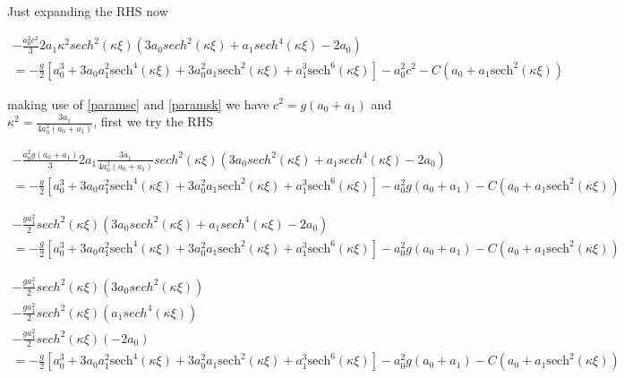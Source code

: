 \documentclass[subeqn]{article}
\begin{document}
 Just expanding the RHS now

\begin{multline*}
- \frac{a_0^2 c^2}{3}{2 a_1 \kappa^2 sech^2(\kappa \xi) \left(3a_0 sech^2(\kappa \xi) + a_1 sech^4(\kappa \xi)- 2a_0 \right)} \\
= {-\frac{g}{2} \left[a_0^3 + 3a_0a_1^2\text{sech}^4\left( \kappa \xi\right) + 3a_0^2a_1\text{sech}^2\left( \kappa \xi\right) + a_1^3\text{sech}^6\left( \kappa \xi\right)   \right] - a_0^2 c^2 - C \left(a_0 + a_1\text{sech}^2\left( \kappa \xi\right) \right)}
\end{multline*}

making use of \eqref{paramsc} and \eqref{paramsk} we have $c^2 = g(a_0 + a_1)$ and $\kappa^2  = \frac{3a_1}{4 a_0^2(a_0 + a_1)}$, first we try the RHS

\begin{multline*}
- \frac{a_0^2 g \left(a_0 + a_1\right)}{3}{2 a_1 \frac{3a_1}{4 a_0^2(a_0 + a_1)} sech^2(\kappa \xi) \left(3a_0 sech^2(\kappa \xi) + a_1 sech^4(\kappa \xi)- 2a_0 \right)} \\
= {-\frac{g}{2} \left[a_0^3 + 3a_0a_1^2\text{sech}^4\left( \kappa \xi\right) + 3a_0^2a_1\text{sech}^2\left( \kappa \xi\right) + a_1^3\text{sech}^6\left( \kappa \xi\right)   \right] - a_0^2 g \left(a_0 + a_1\right) - C \left(a_0 + a_1\text{sech}^2\left( \kappa \xi\right) \right)}
\end{multline*}

\begin{multline*}
- {\frac{ga_1^2 }{2} sech^2(\kappa \xi) \left(3a_0 sech^2(\kappa \xi) + a_1 sech^4(\kappa \xi)- 2a_0 \right)} \\
= {-\frac{g}{2} \left[a_0^3 + 3a_0a_1^2\text{sech}^4\left( \kappa \xi\right) + 3a_0^2a_1\text{sech}^2\left( \kappa \xi\right) + a_1^3\text{sech}^6\left( \kappa \xi\right)   \right] - a_0^2 g \left(a_0 + a_1\right) - C \left(a_0 + a_1\text{sech}^2\left( \kappa \xi\right) \right)}
\end{multline*}

\begin{multline*}
- {\frac{ga_1^2 }{2} sech^2(\kappa \xi) \left(3a_0 sech^2(\kappa \xi)\right)} \\
- {\frac{ga_1^2 }{2} sech^2(\kappa \xi) \left( a_1 sech^4(\kappa \xi) \right)}\\
- {\frac{ga_1^2 }{2} sech^2(\kappa \xi) \left(- 2a_0 \right)}\\
= {-\frac{g}{2} \left[a_0^3 + 3a_0a_1^2\text{sech}^4\left( \kappa \xi\right) + 3a_0^2a_1\text{sech}^2\left( \kappa \xi\right) + a_1^3\text{sech}^6\left( \kappa \xi\right)   \right] - a_0^2 g \left(a_0 + a_1\right) - C \left(a_0 + a_1\text{sech}^2\left( \kappa \xi\right) \right)}
\end{multline*}
\end{document}
